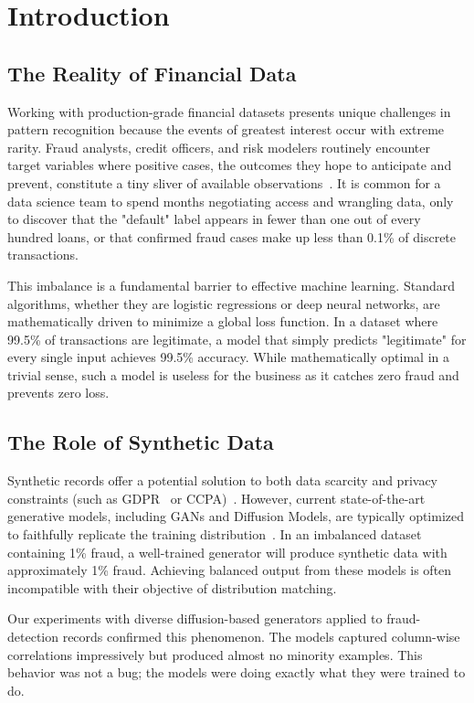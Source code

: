 \documentclass[conference]{IEEEtran}
\begin{document}
\section{Introduction}
\vspace{-2mm}

\subsection{The Reality of Financial Data}
Working with production-grade financial datasets presents unique challenges in pattern recognition because the events of greatest interest occur with extreme rarity. Fraud analysts, credit officers, and risk modelers routinely encounter target variables where positive cases, the outcomes they hope to anticipate and prevent, constitute a tiny sliver of available observations~\cite{he2009imbalanced}. It is common for a data science team to spend months negotiating access and wrangling data, only to discover that the "default" label appears in fewer than one out of every hundred loans, or that confirmed fraud cases make up less than 0.1\% of discrete transactions.

This imbalance is a fundamental barrier to effective machine learning. Standard algorithms, whether they are logistic regressions or deep neural networks, are mathematically driven to minimize a global loss function. In a dataset where 99.5\% of transactions are legitimate, a model that simply predicts "legitimate" for every single input achieves 99.5\% accuracy. While mathematically optimal in a trivial sense, such a model is useless for the business as it catches zero fraud and prevents zero loss.

\subsection{The Role of Synthetic Data}
Synthetic records offer a potential solution to both data scarcity and privacy constraints (such as GDPR~\cite{gdpr2016regulation} or CCPA)~\cite{figueira2022survey}. However, current state-of-the-art generative models, including GANs and Diffusion Models, are typically optimized to faithfully replicate the training distribution~\cite{jordon2022fake}. In an imbalanced dataset containing 1\% fraud, a well-trained generator will produce synthetic data with approximately 1\% fraud. Achieving balanced output from these models is often incompatible with their objective of distribution matching.

Our experiments with diverse diffusion-based generators applied to fraud-detection records confirmed this phenomenon. The models captured column-wise correlations impressively but produced almost no minority examples. This behavior was not a bug; the models were doing exactly what they were trained to do.
\end{document}

